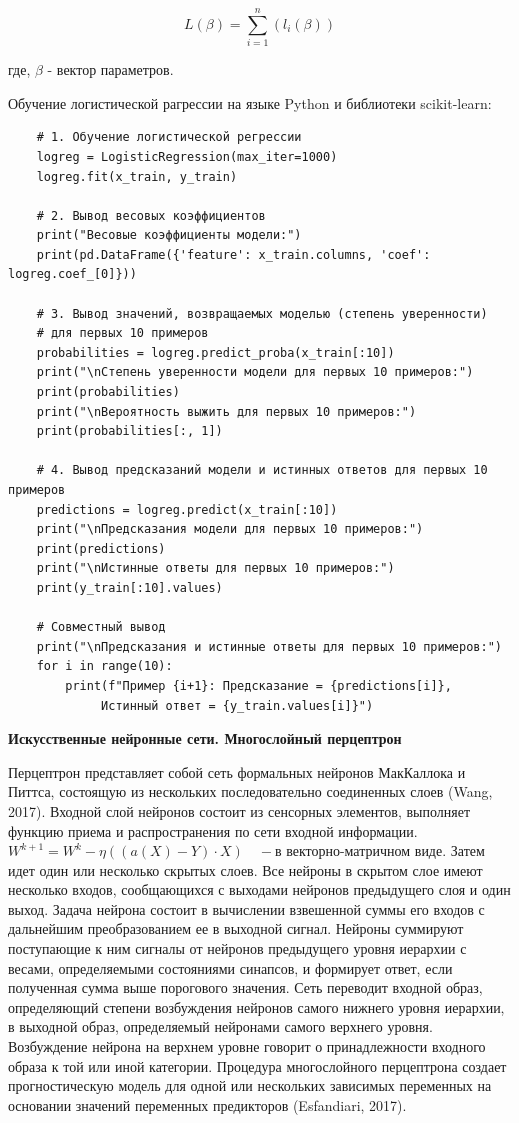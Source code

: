 \documentclass[a4paper,twoside]{article}
\theoremstyle{theorem}
\theoremstyle{remark}
\begin{document}
\begin{equation}
	L(\beta) = \sum_{i=1}^{n}\left(l_i(\beta)\right)
\end{equation}

где, $\beta$ - вектор параметров.

Обучение логистической рагрессии на языке Python и библиотеки scikit-learn:

\begin{verbatim}
	# 1. Обучение логистической регрессии
	logreg = LogisticRegression(max_iter=1000)
	logreg.fit(x_train, y_train)
	
	# 2. Вывод весовых коэффициентов
	print("Весовые коэффициенты модели:")
	print(pd.DataFrame({'feature': x_train.columns, 'coef': logreg.coef_[0]}))
	
	# 3. Вывод значений, возвращаемых моделью (степень уверенности)
	# для первых 10 примеров
	probabilities = logreg.predict_proba(x_train[:10])
	print("\nСтепень уверенности модели для первых 10 примеров:")
	print(probabilities)
	print("\nВероятность выжить для первых 10 примеров:")
	print(probabilities[:, 1])
	
	# 4. Вывод предсказаний модели и истинных ответов для первых 10 примеров
	predictions = logreg.predict(x_train[:10])
	print("\nПредсказания модели для первых 10 примеров:")
	print(predictions)
	print("\nИстинные ответы для первых 10 примеров:")
	print(y_train[:10].values)
	
	# Совместный вывод
	print("\nПредсказания и истинные ответы для первых 10 примеров:")
	for i in range(10):
		print(f"Пример {i+1}: Предсказание = {predictions[i]},
			 Истинный ответ = {y_train.values[i]}")
\end{verbatim}


\textbf{Искусственные нейронные сети. Многослойный перцептрон}

Перцептрон представляет собой сеть формальных нейронов МакКаллока и Питтса, состоящую из нескольких последовательно соединенных слоев (Wang, 2017). Входной слой нейронов состоит из сенсорных элементов, выполняет функцию приема и распространения по сети входной информации. $ W^{k+1} = W^k - \eta ((a(X) - Y) \cdot X) \quad - \text{в векторно-матричном виде.}$ Затем идет один или несколько скрытых слоев. Все нейроны в скрытом слое имеют несколько входов, сообщающихся с выходами нейронов предыдущего слоя и один выход. Задача нейрона состоит в вычислении взвешенной суммы его входов с дальнейшим преобразованием ее в выходной сигнал. Нейроны суммируют поступающие к ним сигналы от нейронов предыдущего уровня иерархии с весами, определяемыми состояниями синапсов, и формирует ответ, если полученная сумма выше порогового значения. Сеть переводит входной образ, определяющий степени возбуждения нейронов самого нижнего уровня иерархии, в выходной образ, определяемый нейронами самого верхнего уровня. Возбуждение нейрона на верхнем уровне говорит о принадлежности входного образа к той или иной категории. Процедура многослойного перцептрона создает прогностическую модель для одной или нескольких зависимых переменных на основании значений переменных предикторов (Esfandiari, 2017).
\end{document}
